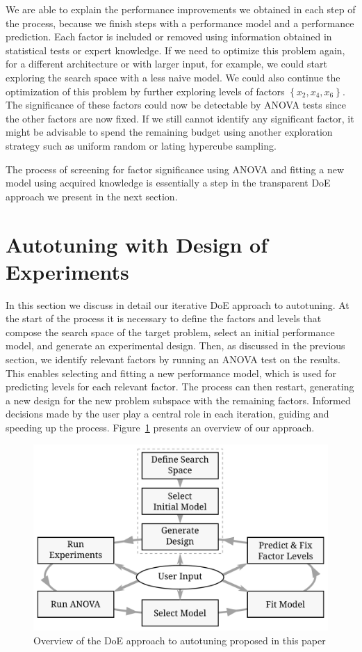 \documentclass[conference]{IEEEtran}
\begin{document}
We are able to explain the performance improvements we obtained in each step of
the process, because we finish steps with a performance model and a performance
prediction. Each factor is included or removed using information obtained in
statistical tests or expert knowledge. If we need to optimize this problem
again, for a different architecture or with larger input, for example, we could
start exploring the search space with a less naive model. We could also continue
the optimization of this problem by further exploring levels of factors
\(\left\{x_2,x_4,x_6\right\}\). The significance of these factors could now be
detectable by ANOVA tests since the other factors are now fixed. If we still
cannot identify any significant factor, it might be advisable to spend the
remaining budget using another exploration strategy such as uniform random or
lating hypercube sampling.

The process of screening for factor significance using ANOVA and fitting a
new model using acquired knowledge is essentially a step in the transparent
DoE approach we present in the next section.
\section{Autotuning with Design of Experiments}
\label{sec:org5836144}
In this section we discuss in detail our iterative DoE
approach to autotuning. At the start of the process it is necessary to define
the factors and levels that compose the search space of the target problem,
select an initial performance model, and generate an experimental design. Then,
as discussed in the previous section, we identify relevant factors by running an
ANOVA test on the results. This enables selecting and fitting a new performance
model, which is used for predicting levels for each relevant factor. The process
can then restart, generating a new design for the new problem subspace with the
remaining factors. Informed decisions made by the user play a central role in
each iteration, guiding and speeding up the process.
Figure~\ref{fig:orga0fc3d1} presents an overview of our approach.

\begin{figure}[b]\vspace{-.5cm}
\centering
\includegraphics[width=.95\columnwidth]{./img/doe_anova_strategy.pdf}
\caption{\label{fig:orga0fc3d1}
Overview of the DoE approach to autotuning proposed in this paper}
\end{figure}
\end{document}
